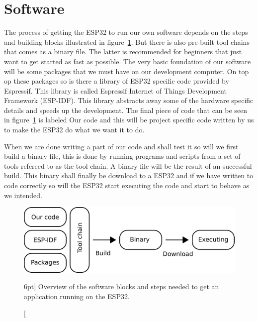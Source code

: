 \documentclass{tufte-book}
\begin{document}
\section{Software}\label{sec:software}

The process of getting the ESP32 to run our own software depends on the steps and building blocks illustrated in figure~\ref{fig:software_anatomy}.
But there is also pre-built tool chains that comes as a binary file. The latter is recommended for beginners that just want to get started as fast as possible.
The very basic foundation of our software will be some packages that we must have on our development computer. On top op these packages so is there a library of ESP32 specific code provided by Espressif. This library is called Espressif Internet of Things Development Framework (ESP-IDF). This library abstracts away some of the hardware specific details and speeds up the development. The final piece of code that can be seen in figure~\ref{fig:software_anatomy} is labeled Our code and this will be project specific code written by us to make the ESP32 do what we want it to do.

When we are done writing a part of our code and shall test it so will we first build a binary file, this is done by running programs and scripts from a set of tools refereed to as the tool chain. A binary file will be the result of an successful build. This binary shall finally be download to a ESP32 and if we have written to code correctly so will the ESP32 start executing the code and start to behave as we intended. 

\begin{figure}
	\includegraphics[scale=1.0]{software_anatomy.png}
	\caption[Software development $n$.][6pt]{
	Overview of the software blocks and steps needed to get an application
	running on the ESP32.
	}
	\label{fig:software_anatomy}
\end{figure}
\end{document}
